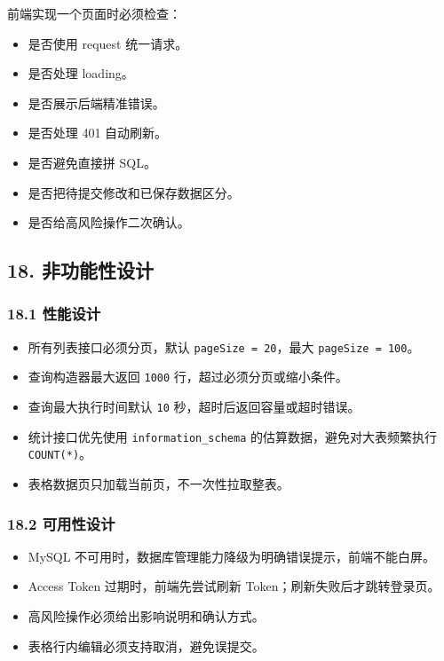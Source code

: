 \documentclass[
  a4paper,
  UTF8]{ctexart}
\providecommand{\tightlist}{%
  \setlength{\itemsep}{0pt}\setlength{\parskip}{0pt}}
\begin{document}
前端实现一个页面时必须检查：

\begin{itemize}
\tightlist
\item
  是否使用 request 统一请求。
\item
  是否处理 loading。
\item
  是否展示后端精准错误。
\item
  是否处理 401 自动刷新。
\item
  是否避免直接拼 SQL。
\item
  是否把待提交修改和已保存数据区分。
\item
  是否给高风险操作二次确认。
\end{itemize}

\hypertarget{ux975eux529fux80fdux6027ux8bbeux8ba1}{%
\subsection{18.
非功能性设计}\label{ux975eux529fux80fdux6027ux8bbeux8ba1}}

\hypertarget{ux6027ux80fdux8bbeux8ba1}{%
\subsubsection{18.1 性能设计}\label{ux6027ux80fdux8bbeux8ba1}}

\begin{itemize}
\tightlist
\item
  所有列表接口必须分页，默认 \texttt{pageSize\ =\ 20}，最大
  \texttt{pageSize\ =\ 100}。
\item
  查询构造器最大返回 \texttt{1000} 行，超过必须分页或缩小条件。
\item
  查询最大执行时间默认 \texttt{10} 秒，超时后返回容量或超时错误。
\item
  统计接口优先使用 \texttt{information\_schema}
  的估算数据，避免对大表频繁执行 \texttt{COUNT(*)}。
\item
  表格数据页只加载当前页，不一次性拉取整表。
\end{itemize}

\hypertarget{ux53efux7528ux6027ux8bbeux8ba1}{%
\subsubsection{18.2 可用性设计}\label{ux53efux7528ux6027ux8bbeux8ba1}}

\begin{itemize}
\tightlist
\item
  MySQL 不可用时，数据库管理能力降级为明确错误提示，前端不能白屏。
\item
  Access Token 过期时，前端先尝试刷新 Token；刷新失败后才跳转登录页。
\item
  高风险操作必须给出影响说明和确认方式。
\item
  表格行内编辑必须支持取消，避免误提交。
\end{itemize}
\end{document}
